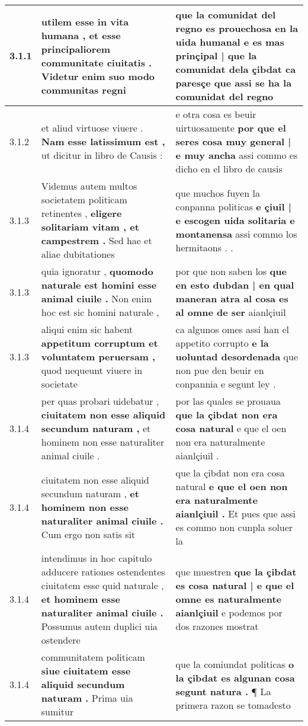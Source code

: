 \begin{tabular}{|p{1cm}|p{6.5cm}|p{6.5cm}|}
3.1.1 & utilem esse in vita humana , \textbf{ et esse principaliorem communitate ciuitatis . } Videtur enim suo modo communitas regni & que la comunidat del regno es prouechosa en la uida humanal \textbf{ e es mas prinçipal | que la comunidat dela çibdat ca paresçe } que assi se ha la comunidat del regno \\\hline
3.1.2 & et aliud virtuose viuere . \textbf{ Nam esse latissimum est , } ut dicitur in libro de Causis : & e otra cosa es beuir uirtuosamente \textbf{ por que el seres cosa muy general | e muy ancha } assi commo es dicho en el libro de causis \\\hline
3.1.3 & Videmus autem multos societatem politicam retinentes , \textbf{ eligere solitariam vitam , et campestrem . } Sed hae et aliae dubitationes & que muchos fuyen la conpanna politicas \textbf{ e çiuil | e escogen uida solitaria e montanensa } assi commo los hermitaons . . \\\hline
3.1.3 & quia ignoratur , \textbf{ quomodo naturale est homini esse animal ciuile . } Non enim hoc est sic homini naturale , & por que non saben los \textbf{ que en esto dubdan | en qual maneran atra al cosa es al omne de ser } aianlçiuil \\\hline
3.1.3 & aliqui enim sic habent \textbf{ appetitum corruptum et voluntatem peruersam , } quod nequeunt viuere in societate & ca algunos omes assi han el appetito corrupto \textbf{ e la uoluntad desordenada } que non pue den beuir en conpannia e segunt ley . \\\hline
3.1.4 & per quas probari uidebatur , \textbf{ ciuitatem non esse aliquid secundum naturam , } et hominem non esse naturaliter animal ciuile . & por las quales se prouaua \textbf{ que la çibdat non era cosa natural } e que el oen non era naturalmente aianlçiuil . \\\hline
3.1.4 & ciuitatem non esse aliquid secundum naturam , \textbf{ et hominem non esse naturaliter animal ciuile . } Cum ergo non satis sit & que la çibdat non era cosa natural \textbf{ e que el oen non era naturalmente aianlçiuil . } Et pues que assi es commo non cunpla soluer la \\\hline
3.1.4 & intendimus in hoc capitulo adducere rationes ostendentes ciuitatem esse quid naturale , \textbf{ et hominem esse naturaliter animal ciuile . } Possumus autem duplici uia ostendere & que muestren \textbf{ que la çibdat es cosa natural | e que el omne es naturalmente aianlçiuil } e podemos por dos razones mostrat \\\hline
3.1.4 & communitatem politicam \textbf{ siue ciuitatem esse aliquid secundum naturam . } Prima uia sumitur & que la comiundat politicas \textbf{ o la çibdat es algunan cosa segunt natura . } ¶ La primera razon se tomadesto \\\hline

\end{tabular}
